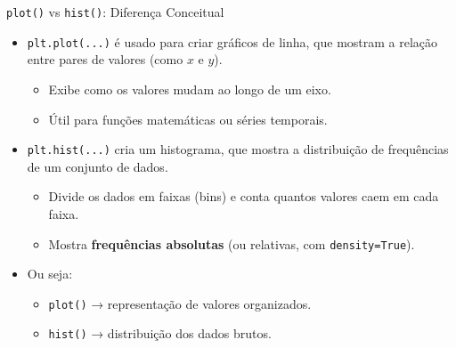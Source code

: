 \begin{frame}{\texttt{plot()} vs \texttt{hist()}: Diferença Conceitual}
    \begin{itemize}
        \item \texttt{plt.plot(...)} é usado para criar gráficos de linha, que mostram a relação entre pares de valores (como \(x\) e \(y\)).
              \begin{itemize}
                  \item Exibe como os valores mudam ao longo de um eixo.
                  \item Útil para funções matemáticas ou séries temporais.
              \end{itemize}
        \item \texttt{plt.hist(...)} cria um histograma, que mostra a distribuição de frequências de um conjunto de dados.
              \begin{itemize}
                  \item Divide os dados em faixas (bins) e conta quantos valores caem em cada faixa.
                  \item Mostra \textbf{frequências absolutas} (ou relativas, com \texttt{density=True}).
              \end{itemize}
        \item Ou seja:
              \begin{itemize}
                  \item \texttt{plot()} → representação de valores organizados.
                  \item \texttt{hist()} → distribuição dos dados brutos.
              \end{itemize}
    \end{itemize}
\end{frame}


